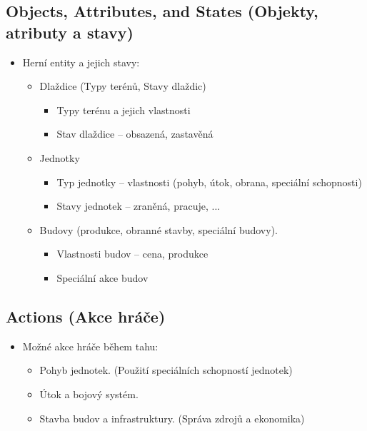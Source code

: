 \subsection{Objects, Attributes, and States (Objekty, atributy a stavy)}
\begin{itemize}
    \item Herní entity a jejich stavy:
    \begin{itemize}
        \item Dlaždice (Typy terénů, Stavy dlaždic)
        \begin{itemize}
            \item Typy terénu a jejich vlastnosti
            \item Stav dlaždice -- obsazená, zastavěná
        \end{itemize}
        \item Jednotky
        \begin{itemize}
            \item Typ jednotky -- vlastnosti (pohyb, útok, obrana, speciální schopnosti)
            \item Stavy jednotek -- zraněná, pracuje, ...
        \end{itemize}
        \item Budovy (produkce, obranné stavby, speciální budovy).
        \begin{itemize}
            \item Vlastnosti budov -- cena, produkce
            \item Speciální akce budov
        \end{itemize}
    \end{itemize}
\end{itemize}

\subsection{Actions (Akce hráče)}
\begin{itemize}
    \item Možné akce hráče během tahu:
    \begin{itemize}
        \item Pohyb jednotek. (Použití speciálních schopností jednotek)
        \item Útok a bojový systém. 
        \item Stavba budov a infrastruktury. (Správa zdrojů a ekonomika)
    \end{itemize}
\end{itemize}

